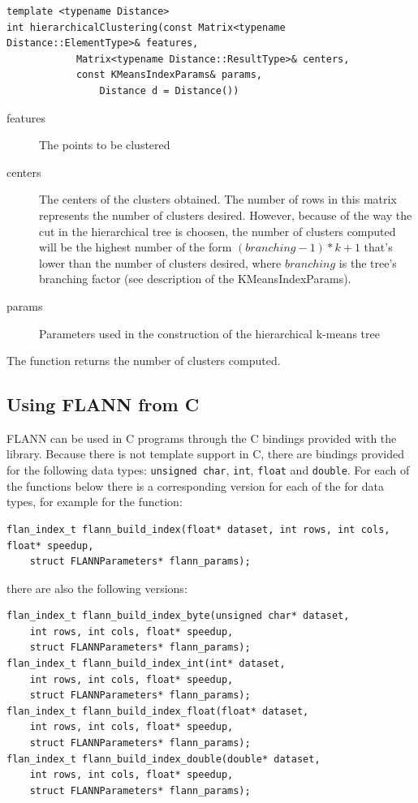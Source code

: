 \documentclass[letter,10pt]{article}
\begin{document}
\begin{Verbatim}[fontsize=\footnotesize,frame=single]
template <typename Distance>
int hierarchicalClustering(const Matrix<typename Distance::ElementType>& features, 
			Matrix<typename Distance::ResultType>& centers,
			const KMeansIndexParams& params, 
		        Distance d = Distance())
\end{Verbatim}
\begin{description}
\item[features]{The points to be clustered}
\item[centers]{The centers of the clusters obtained. The number of rows in this matrix represents the number of clusters desired.
However, because of the way the cut in the hierarchical tree is choosen, the number of clusters computed will be
 the highest number of the form $(branching-1)*k+1$ that's lower than the number of clusters desired, where $branching$ is the tree's 
branching factor (see description of the KMeansIndexParams).  }
\item[params]{Parameters used in the construction of the hierarchical k-means tree}
\end{description}
The function returns the number of clusters computed.





\subsection{Using FLANN from C}

FLANN can be used in C programs through the C bindings provided
with the library. Because there is not template support in C, there
are bindings provided for the following data types: \texttt{unsigned char},
\texttt{int}, \texttt{float} and \texttt{double}. For each of the functions 
below there is a corresponding version for each of the for data types, for example
for the function:
\begin{Verbatim}[fontsize=\footnotesize,frame=single]
flan_index_t flann_build_index(float* dataset, int rows, int cols, float* speedup,
	struct FLANNParameters* flann_params);
\end{Verbatim}
there are also the following versions:
\begin{Verbatim}[fontsize=\footnotesize,frame=single]
flan_index_t flann_build_index_byte(unsigned char* dataset,
	int rows, int cols, float* speedup,
	struct FLANNParameters* flann_params);
flan_index_t flann_build_index_int(int* dataset,
	int rows, int cols, float* speedup,
	struct FLANNParameters* flann_params);
flan_index_t flann_build_index_float(float* dataset,
	int rows, int cols, float* speedup,
	struct FLANNParameters* flann_params);
flan_index_t flann_build_index_double(double* dataset,
	int rows, int cols, float* speedup,
	struct FLANNParameters* flann_params);
\end{Verbatim}
\end{document}
